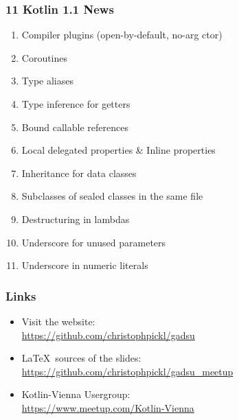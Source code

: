 \begin{frame}\frametitle{11 Kotlin 1.1 News}
\begin{enumerate}[<+->]
	\item {Compiler plugins (open-by-default, no-arg ctor)}
	\item {Coroutines}
	\item Type aliases
	\item Type inference for getters
	\item Bound callable references
	\item Local delegated properties \& Inline properties
	\item Inheritance for data classes
	\item Subclasses of sealed classes in the same file
	\item Destructuring in lambdas
	\item Underscore for unused parameters
	\item Underscore in numeric literals
\end{enumerate}
\end{frame}



\begin{frame}\frametitle{Links}

\begin{itemize}
	\item Visit the website: \\ \href{https://github.com/christophpickl/gadsu}{https://github.com/christophpickl/gadsu}
	\item \LaTeX~sources of the slides: \\ \href{https://github.com/christophpickl/gadsu_meetup}{https://github.com/christophpickl/gadsu\_meetup}
	\item Kotlin-Vienna Usergroup: \\ \href{https://www.meetup.com/Kotlin-Vienna}{https://www.meetup.com/Kotlin-Vienna}
	
\end{itemize}

\end{frame}




